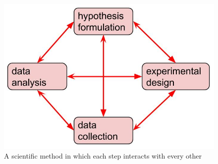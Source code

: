 \begin{figure}
  \includegraphics[scale=0.5]{figures/scientific_method}
  \caption{A scientific method in which each step interacts with every other}
  \label{scientific_method}
\end{figure}

